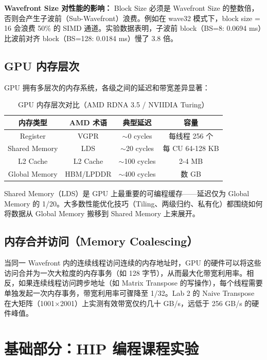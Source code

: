 \documentclass[a4paper]{article}
\begin{document}
\textbf{Wavefront Size 对性能的影响：} Block Size 必须是 Wavefront Size 的整数倍，否则会产生子波前（Sub-Wavefront）浪费。例如在 wave32 模式下，block size = 16 会浪费 50\% 的 SIMD 通道。实验数据表明，子波前 block（BS=8: 0.0694 ms）比波前对齐 block（BS=128: 0.0184 ms）慢了 3.8 倍。

\subsection{GPU 内存层次}

GPU 拥有多层次的内存系统，各级之间的延迟和带宽差异显著：

\begin{table}[H]
  \centering
  \caption{GPU 内存层次对比（AMD RDNA 3.5 / NVIIDIA Turing）}
  \begin{tabular}{|c|c|c|c|}
  \hline
  \textbf{内存类型} & \textbf{AMD 术语} & \textbf{典型延迟} & \textbf{容量} \\
  \hline
  Register & VGPR & $\sim$0 cycles & 每线程 256 个 \\
  Shared Memory & LDS & $\sim$20 cycles & 每 CU 64-128 KB \\
  L2 Cache & L2 Cache & $\sim$100 cycles & 2-4 MB \\
  Global Memory & HBM/LPDDR & $\sim$400 cycles & 数 GB \\
  \hline
  \end{tabular}
\end{table}

Shared Memory（LDS）是 GPU 上最重要的可编程缓存——延迟仅为 Global Memory 的 1/20。大多数性能优化技巧（Tiling、两级归约、私有化）都围绕如何将数据从 Global Memory 搬移到 Shared Memory 上来展开。

\subsection{内存合并访问（Memory Coalescing）}

当同一 Wavefront 内的连续线程访问连续的内存地址时，GPU 的硬件可以将这些访问合并为一次大粒度的内存事务（如 128 字节），从而最大化带宽利用率。相反，如果连续线程访问跨步地址（如 Matrix Transpose 的写操作），每个线程需要单独发起一次内存事务，带宽利用率可骤降至 1/32。Lab 2 的 Naive Transpose 在大矩阵（1001×2001）上实测有效带宽仅约几十 GB/s，远低于 256 GB/s 的硬件峰值。

\section{基础部分：HIP 编程课程实验}
\end{document}
